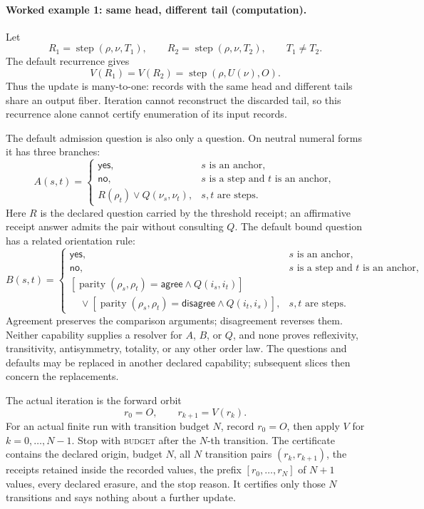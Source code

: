 \paragraph{Worked example 1: same head, different tail (computation).}
Let
\[
 R_1=\operatorname{step}(\rho,\nu,T_1),\qquad
 R_2=\operatorname{step}(\rho,\nu,T_2),\qquad T_1\ne T_2.
\]
The default recurrence gives
\[
                       V(R_1)=V(R_2)=\operatorname{step}(\rho,U(\nu),O).
\]
Thus the update is many-to-one: records with the same head and different tails share an output fiber.  Iteration cannot
reconstruct the discarded tail, so this recurrence alone cannot certify enumeration of its input records.

The default admission question is also only a question.  On neutral numeral forms it has three branches:
\[
 A(s,t)=
 \begin{cases}
 \mathsf{yes},&s\text{ is an anchor},\\
 \mathsf{no},&s\text{ is a step and }t\text{ is an anchor},\\
 R(\rho_t)\lor Q(\nu_s,\nu_t),&s,t\text{ are steps}.
 \end{cases}
\]
Here \(R\) is the declared question carried by the threshold receipt; an affirmative receipt answer admits the pair
without consulting \(Q\).
The default bound question has a related orientation rule:
\[
 B(s,t)=
 \begin{cases}
 \mathsf{yes},&s\text{ is an anchor},\\
 \mathsf{no},&s\text{ is a step and }t\text{ is an anchor},\\
 [\operatorname{parity}(\rho_s,\rho_t)=\mathsf{agree}\land Q(i_s,i_t)]\\
 \quad{}\lor[\operatorname{parity}(\rho_s,\rho_t)=\mathsf{disagree}\land Q(i_t,i_s)],
 &s,t\text{ are steps}.
 \end{cases}
\]
Agreement preserves the comparison arguments; disagreement reverses them.  Neither capability supplies a resolver for
\(A\), \(B\), or \(Q\), and none proves reflexivity, transitivity, antisymmetry, totality, or any other order law.
The questions and defaults may be replaced in another declared capability; subsequent slices then concern the
replacements.

The actual iteration is the forward orbit
\[
                   r_0=O,\qquad r_{k+1}=V(r_k).
\]
For an actual finite run with transition budget \(N\), record \(r_0=O\), then apply \(V\) for
\(k=0,\ldots,N-1\).  Stop with \textsc{budget} after the \(N\)-th transition.  The certificate contains the declared
origin, budget \(N\), all \(N\) transition pairs \((r_k,r_{k+1})\), the receipts retained inside the recorded values,
the prefix \([r_0,\ldots,r_N]\) of \(N+1\) values, every declared
erasure, and the stop reason.  It certifies only those \(N\) transitions and says nothing about a further update.

